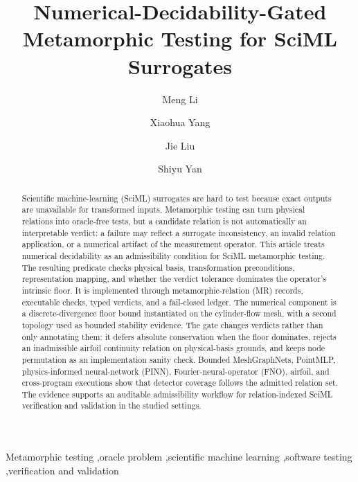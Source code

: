 \documentclass[preprint,12pt,authoryear]{elsarticle}
\begin{document}
\begin{frontmatter}

\title{Numerical-Decidability-Gated Metamorphic Testing for SciML Surrogates}

\author[inst1,inst2,inst3]{Meng Li}
\author[inst1,inst2,inst3]{Xiaohua Yang}
\author[inst1,inst2,inst3]{Jie Liu}
\author[inst1,inst2,inst3]{Shiyu Yan}

\begin{abstract}
Scientific machine-learning (SciML) surrogates are hard to test because exact
outputs are unavailable for transformed inputs. Metamorphic testing can
turn physical relations into oracle-free tests, but a candidate relation is not
automatically an interpretable verdict: a failure may reflect a surrogate
inconsistency, an invalid relation application, or a numerical artifact of the
measurement operator. This article treats numerical decidability as an
admissibility condition for SciML metamorphic testing. The resulting predicate
checks physical basis, transformation preconditions, representation mapping,
and whether the verdict tolerance dominates the operator's intrinsic floor. It
is implemented through metamorphic-relation (MR) records, executable checks, typed verdicts,
and a fail-closed ledger. The numerical component is a discrete-divergence
floor bound instantiated on the cylinder-flow mesh, with a second topology
used as bounded stability evidence. The gate changes verdicts rather than only annotating
them: it defers absolute conservation when the floor dominates, rejects an
inadmissible airfoil continuity relation on physical-basis grounds, and keeps
node permutation as an implementation sanity check. Bounded MeshGraphNets,
PointMLP, physics-informed neural-network (PINN), Fourier-neural-operator (FNO),
airfoil, and cross-program executions show that detector
coverage follows the admitted relation set. The evidence supports an auditable
admissibility workflow for relation-indexed SciML verification and validation in the studied settings.
\end{abstract}


\begin{keyword}
Metamorphic testing \sep oracle problem \sep scientific machine learning \sep software testing \sep verification and validation
\end{keyword}

\end{frontmatter}
\end{document}
